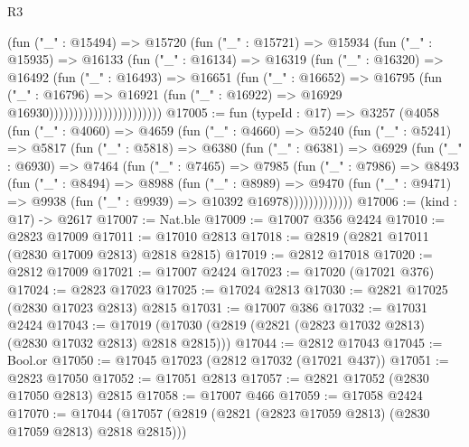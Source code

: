 \begin{lexlean}{R3}
\begin{coremodule}
                                (fun ("_" : @15494) =>
                                @15720
                                  (fun ("_" : @15721) =>
                                  @15934
                                    (fun ("_" : @15935) =>
                                    @16133
                                      (fun ("_" : @16134) =>
                                      @16319
                                        (fun ("_" : @16320) =>
                                        @16492
                                          (fun ("_" : @16493) =>
                                          @16651
                                            (fun ("_" : @16652) =>
                                            @16795
                                              (fun ("_" : @16796) =>
                                              @16921
                                                (fun ("_" : @16922) =>
                                                @16929 @16930)))))))))))))))))))))))
@17005 := fun (typeId : @17) =>
  @3257
    (@4058
      (fun ("_" : @4060) =>
      @4659
        (fun ("_" : @4660) =>
        @5240
          (fun ("_" : @5241) =>
          @5817
            (fun ("_" : @5818) =>
            @6380
              (fun ("_" : @6381) =>
              @6929
                (fun ("_" : @6930) =>
                @7464
                  (fun ("_" : @7465) =>
                  @7985
                    (fun ("_" : @7986) =>
                    @8493
                      (fun ("_" : @8494) =>
                      @8988
                        (fun ("_" : @8989) =>
                        @9470
                          (fun ("_" : @9471) =>
                          @9938 (fun ("_" : @9939) => @10392 @16978)))))))))))))
@17006 := (kind : @17) -> @2617
@17007 := Nat.ble
@17009 := @17007 @356 @2424
@17010 := @2823 @17009
@17011 := @17010 @2813
@17018 := @2819 (@2821 @17011 (@2830 @17009 @2813) @2818 @2815)
@17019 := @2812 @17018
@17020 := @2812 @17009
@17021 := @17007 @2424
@17023 := @17020 (@17021 @376)
@17024 := @2823 @17023
@17025 := @17024 @2813
@17030 := @2821 @17025 (@2830 @17023 @2813) @2815
@17031 := @17007 @386
@17032 := @17031 @2424
@17043 := @17019 (@17030 (@2819 (@2821 (@2823 @17032 @2813) (@2830 @17032 @2813) @2818 @2815)))
@17044 := @2812 @17043
@17045 := Bool.or
@17050 := @17045 @17023 (@2812 @17032 (@17021 @437))
@17051 := @2823 @17050
@17052 := @17051 @2813
@17057 := @2821 @17052 (@2830 @17050 @2813) @2815
@17058 := @17007 @466
@17059 := @17058 @2424
@17070 := @17044 (@17057 (@2819 (@2821 (@2823 @17059 @2813) (@2830 @17059 @2813) @2818 @2815)))

\end{coremodule}
\end{lexlean}
